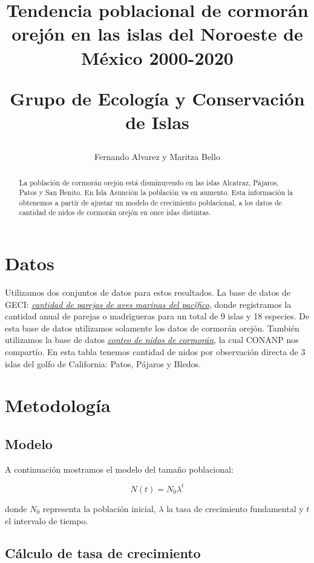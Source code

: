 \documentclass{article} %
\author{Fernando Alvarez y Maritza Bello}
\title{Tendencia poblacional de cormorán orejón en las islas del Noroeste de México 2000-2020\\ \begin{large} Grupo de Ecología y Conservación de Islas \end{large}}
\begin{document}
\maketitle

\begin{abstract}
La población de cormorán orejón está disminuyendo en las islas Alcatraz, Pájaros, Patos y San Benito. En Isla Asunción la población va en aumento. Esta información la obtenemos a partir de ajustar un modelo de crecimiento poblacional, a los datos de cantidad de nidos de cormorán orejón en once islas distintas.

\end{abstract}

\section*{Datos}

Utilizamos dos conjuntos de datos para estos resultados. La base de datos de GECI: \href{https://drive.google.com/drive/u/0/folders/1K2-itQXbNXPhrz4Pb3eRr9NG9A4rR47o}{{\color{blue}\textit{cantidad de parejas de aves marinas del pacífico}}}, donde registramos la cantidad anual de parejas o madrigueras para un total de 9 islas y 18 especies. De esta base de datos utilizamos solamente los datos de cormorán orejón. También utilizamos la base de datos \href{https://drive.google.com/drive/folders/1aXmotwcGcZjK52USWMdlZoffaMUlI0tT}{{\color{blue}\textit{\underline{conteo de nidos de cormorán}}}}, la cual CONANP nos compartío. En esta tabla tenemos cantidad de nidos por observación directa de 3 islas del golfo de California: Patos, Pájaros y Bledos.


\section*{Metodología}
\subsection*{Modelo}
A continuación mostramos el modelo del tamaño poblacional:

\begin{equation}
N(t)=N_{0}\lambda^{t}
\end{equation}

\noindent donde $N_{0}$ representa la población inicial, $\lambda$ la tasa de crecimiento fundamental y $t$ el intervalo de tiempo. 

\subsection*{Cálculo de tasa de crecimiento}
\end{document}
